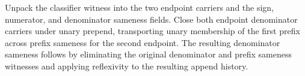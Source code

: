 Unpack the classifier witness into the two endpoint carriers and the sign,
numerator, and denominator sameness fields. Close both endpoint denominator
carriers under unary prepend, transporting unary membership of the first prefix
across prefix sameness for the second endpoint. The resulting denominator
sameness follows by eliminating the original denominator and prefix sameness
witnesses and applying reflexivity to the resulting append history.

